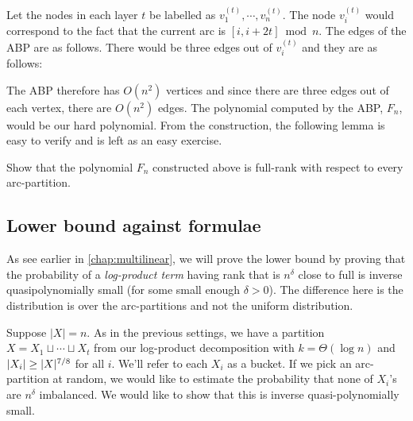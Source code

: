 Let the nodes in each layer $t$ be labelled as $v_1^{(t)},\cdots, v_n^{(t)}$. The node $v_i^{(t)}$ would correspond to the fact that the current arc is $[i,i+2t] \bmod{n}$. The edges of the ABP are as follows. There would be three edges out of $v_i^{(t)}$ and they are as follows:


The ABP therefore has $O(n^2)$ vertices and since there are three edges out of each vertex, there are $O(n^2)$ edges. The polynomial computed by the ABP, $F_n$, would be our hard polynomial. From the construction, the following lemma is easy to verify and is left as an easy exercise.

\begin{exercise}
  Show that the polynomial $F_n$ constructed above is full-rank with respect to every arc-partition.
\end{exercise}


\subsection{Lower bound against formulae}

As see earlier in \autoref{chap:multilinear}, we will prove the lower bound by proving that the probability of a \emph{log-product term} having rank that is $n^{\delta}$ close to full is inverse quasipolynomially small (for some small enough $\delta > 0$). The difference here is the distribution is over the arc-partitions and not the uniform distribution.

Suppose $|X| = n$. As in the previous settings, we have a partition $X = X_1 \sqcup \cdots \sqcup X_t$ from our log-product decomposition with $k = \Theta(\log n)$ and $\left|X_i\right| \geq |X|^{7/8}$ for all $i$. We'll refer to each $X_i$ as a bucket.
If we pick an arc-partition at random, we would like to estimate the probability that none of $X_i$'s are $n^\delta$ imbalanced. We would like to show that this is inverse quasi-polynomially small. 

